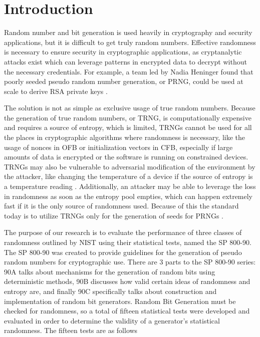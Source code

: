 \documentclass[11pt,letterpaper,conference]{IEEEtran}
\begin{document}
\section{Introduction}
Random number and bit generation is used heavily in cryptography and security applications, but it
is difficult to get truly random numbers. Effective randomness is necessary to ensure security in
cryptographic applications, as cryptanalytic attacks exist which can leverage patterns in encrypted
data to decrypt without the necessary credentials. For example, a team led by Nadia Heninger found
that poorly seeded pseudo random number generation, or PRNG, could be used at scale to derive RSA
private keys \cite{heninger2012mining}.

The solution is not as simple as exclusive usage of true random numbers. Because the generation of
true random numbers, or TRNG, is computationally expensive and requires a source of entropy, which
is limited, TRNGs cannot be used for all the places in cryptographic algorithms where randomness is
necessary, like the usage of nonces in OFB or initialization vectors in CFB, especially if large amounts
of data is encrypted or the software is running on constrained devices. TRNGs may also be vulnerable to
adversarial modification of the environment by the attacker, like changing the temperature of a device
if the source of entropy is a temperature reading \cite{barak2003true}. Additionally, an attacker may
be able to leverage the loss in randomness as soon as the entropy pool empties, which can happen extremely
fast if it is the only source of randomness used. Because of this the standard today is to utilize TRNGs
only for the generation of seeds for PRNGs \cite{8276259}.

The purpose of our research is to evaluate the performance of three classes of randomness outlined by NIST
using their statistical tests, named the SP 800-90. The SP 800-90 was created to provide guidelines for
the generation of pseudo random numbers for cryptographic use. There are 3 parts to the SP 800-90 series:
90A talks about mechanisms for the generation of random bits using deterministic methods, 90B
discusses how valid certain ideas of randomness and entropy are, and finally 90C
specifically talks about construction and implementation of random bit generators. Random Bit
Generation must be checked for randomness, so a total of fifteen statistical tests were developed
and evaluated in order to determine the validity of a generator's statistical randomness. The fifteen
tests are as follows
\end{document}
